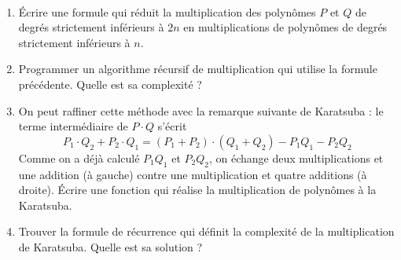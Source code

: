 \documentclass[class=report,crop=false]{standalone}
\begin{document}
\begin{tp}~
\begin{enumerate}
  \item \'Ecrire une formule qui réduit la multiplication des polynômes $P$ et $Q$ de degrés strictement inférieurs à $2n$ en
multiplications de polynômes de degrés strictement inférieurs à $n$.

  \item Programmer un algorithme récursif de multiplication qui utilise la formule précédente. Quelle est sa complexité ?

  \item On peut raffiner cette méthode avec la remarque suivante de Karatsuba : le terme intermédiaire de $P \cdot Q$ s’écrit
$$P_1 \cdot Q_2 + P_2 \cdot Q_1 = (P_1 + P_2 ) \cdot (Q_1 + Q_2 ) - P_1 Q_1 - P_2 Q_2$$
Comme on a déjà calculé $P_1Q_1$ et $P_2Q_2$, on échange deux multiplications et une addition (à gauche)
contre une multiplication et quatre additions (à droite).
\'Ecrire une fonction qui réalise la multiplication de polynômes à la Karatsuba.

  \item Trouver la formule de récurrence qui définit la complexité de la multiplication de Karatsuba. Quelle est sa solution ?
\end{enumerate}
\end{tp}
\end{document}
